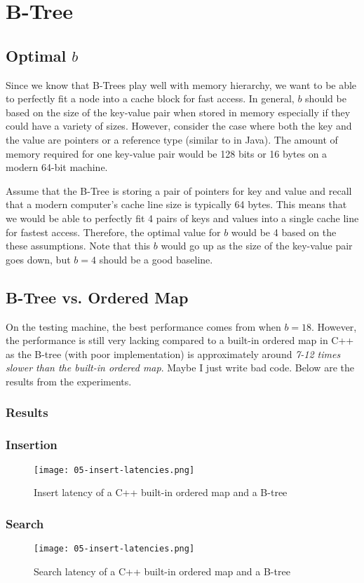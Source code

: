 \section{B-Tree}

\subsection{Optimal $b$}

Since we know that B-Trees play well with memory hierarchy, we want to be able to perfectly fit a node into a cache block for fast access.
In general, $b$ should be based on the size of the key-value pair when stored in memory especially if they could have a variety of sizes.
However, consider the case where both the key and the value are pointers or a reference type (similar to in Java).
The amount of memory required for one key-value pair would be 128 bits or 16 bytes on a modern 64-bit machine.

Assume that the B-Tree is storing a pair of pointers for key and value and recall that a modern computer's cache line size is typically 64 bytes. This means that we would be able to perfectly fit 4 pairs of keys and values into a single cache line for fastest access. Therefore, the optimal value for $b$ would be 4 based on the these assumptions. Note that this $b$ would go up as the size of the key-value pair goes down, but $b = 4$ should be a good baseline.

\subsection{B-Tree vs. Ordered Map}

On the testing machine, the best performance comes from when $b = 18$. However, the performance is still very lacking compared to a built-in ordered map in C++ as the B-tree (with poor implementation) is approximately around \textit{7-12 times slower than the built-in ordered map}. Maybe I just write bad code. Below are the results from the experiments.

\subsubsection{Results}

\subsubsection*{Insertion}

\begin{figure}[H]
	\begin{center}
		\texttt{[image: 05-insert-latencies.png]}
		\caption{Insert latency of a C++ built-in ordered map and a B-tree}
		\label{fig:05-insert-latency}
	\end{center}
\end{figure}

\subsubsection*{Search}

\begin{figure}[H]
	\begin{center}
		\texttt{[image: 05-insert-latencies.png]}
		\caption{Search latency of a C++ built-in ordered map and a B-tree}
		\label{fig:05-search-latency}
	\end{center}
\end{figure}
